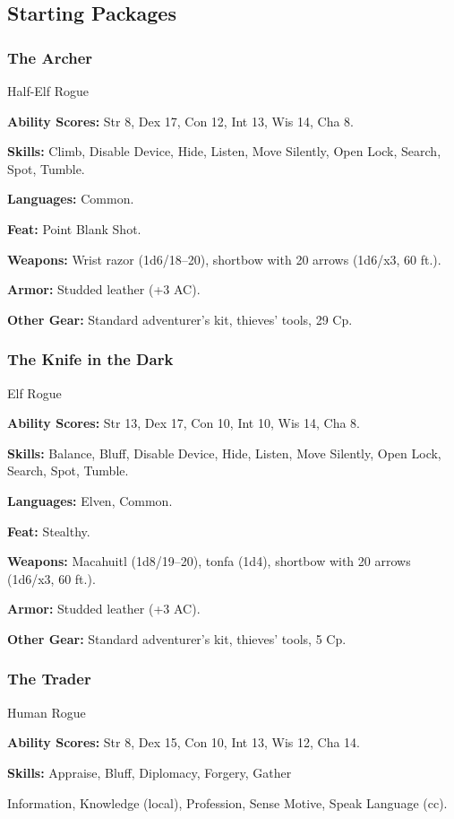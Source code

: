 \subsection{Starting Packages}
\subsubsection{The Archer}
Half-Elf Rogue

\textbf{Ability Scores:} Str 8, Dex 17, Con 12, Int 13, Wis 14, Cha 8.

\textbf{Skills:} Climb, Disable Device, Hide, Listen, Move Silently, Open Lock, Search, Spot, Tumble.

\textbf{Languages:} Common.

\textbf{Feat:} Point Blank Shot.

\textbf{Weapons:} Wrist razor (1d6/18–20), shortbow with 20 arrows (1d6/x3, 60 ft.).

\textbf{Armor:} Studded leather (+3 AC).

\textbf{Other Gear:} Standard adventurer's kit, thieves' tools, 29 Cp.

\subsubsection{The Knife in the Dark}
Elf Rogue

\textbf{Ability Scores:} Str 13, Dex 17, Con 10, Int 10, Wis 14, Cha 8.

\textbf{Skills:} Balance, Bluff, Disable Device, Hide, Listen, Move Silently, Open Lock, Search, Spot, Tumble.

\textbf{Languages:} Elven, Common.

\textbf{Feat:} Stealthy.

\textbf{Weapons:} Macahuitl (1d8/19–20), tonfa (1d4), shortbow with 20 arrows (1d6/x3, 60 ft.).

\textbf{Armor:} Studded leather (+3 AC).

\textbf{Other Gear:} Standard adventurer's kit, thieves' tools, 5 Cp.

\subsubsection{The Trader}
Human Rogue

\textbf{Ability Scores:} Str 8, Dex 15, Con 10, Int 13, Wis 12, Cha 14.

\textbf{Skills:} Appraise, Bluff, Diplomacy, Forgery, Gather

Information, Knowledge (local), Profession, Sense Motive, Speak Language (cc).

